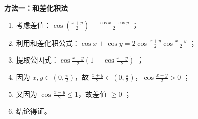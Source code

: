 \begin{proofbox}
\textbf{方法一：和差化积法}
\begin{enumerate}
    \item 考虑差值：$\cos\left(\frac{x+y}{2}\right) - \frac{\cos x + \cos y}{2}$ ；
    \item 利用和差化积公式：$\cos x + \cos y = 2\cos\frac{x+y}{2}\cos\frac{x-y}{2}$ ；
    \item 提取公因式：$\cos\frac{x+y}{2} \left(1 - \cos\frac{x-y}{2}\right)$ ；
    \item 因为 $x, y \in (0, \frac{\pi}{2})$，故 $\frac{x+y}{2} \in (0, \frac{\pi}{2})$，$\cos\frac{x+y}{2} > 0$ ；
    \item 又因为 $\cos\frac{x-y}{2} \leqslant 1$，故差值 $\geqslant 0$ ；
    \item 结论得证。
\end{enumerate}
\end{proofbox}